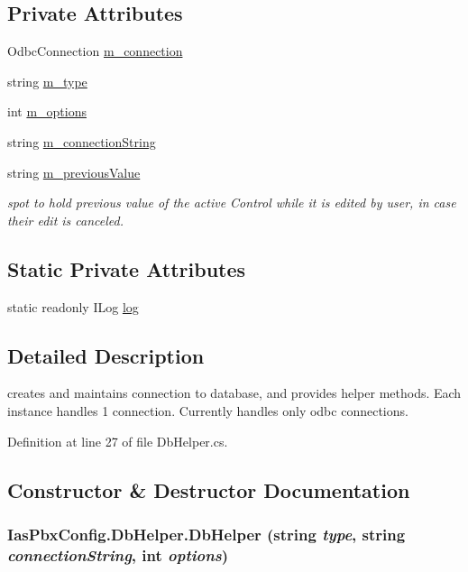 \subsection*{Private Attributes}
\begin{DoxyCompactItemize}
\item 
OdbcConnection \hyperlink{class_ias_pbx_config_1_1_db_helper_ad2f4da25190daab4caadf0fd961fdc7a}{m\_\-connection}
\item 
string \hyperlink{class_ias_pbx_config_1_1_db_helper_a6b83549fc7774e7b50312bcc61a53f77}{m\_\-type}
\item 
int \hyperlink{class_ias_pbx_config_1_1_db_helper_a0efac22d5176062fc601faff46508240}{m\_\-options}
\item 
string \hyperlink{class_ias_pbx_config_1_1_db_helper_acec1410fc508a1269f93e1e378aa3006}{m\_\-connectionString}
\item 
string \hyperlink{class_ias_pbx_config_1_1_db_helper_af297028c911777148642b2eed5c2d42b}{m\_\-previousValue}
\begin{DoxyCompactList}\small\item\em spot to hold previous value of the active Control while it is edited by user, in case their edit is canceled. \item\end{DoxyCompactList}\end{DoxyCompactItemize}
\subsection*{Static Private Attributes}
\begin{DoxyCompactItemize}
\item 
static readonly ILog \hyperlink{class_ias_pbx_config_1_1_db_helper_a0857140c11e1ae5ca696a95337a655b2}{log}
\end{DoxyCompactItemize}


\subsection{Detailed Description}
creates and maintains connection to database, and provides helper methods. Each instance handles 1 connection. Currently handles only odbc connections. 

Definition at line 27 of file DbHelper.cs.

\subsection{Constructor \& Destructor Documentation}
\hypertarget{class_ias_pbx_config_1_1_db_helper_a89a1108a7133811930d8a20f0c53909d}{
\subsubsection[{DbHelper}]{\setlength{\rightskip}{0pt plus 5cm}IasPbxConfig.DbHelper.DbHelper (string {\em type}, \/  string {\em connectionString}, \/  int {\em options})}}
\label{class_ias_pbx_config_1_1_db_helper_a89a1108a7133811930d8a20f0c53909d}


